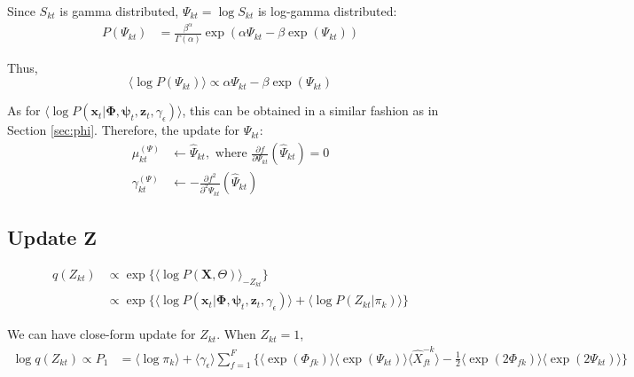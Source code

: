 \documentclass[11pt]{article} %
\begin{document}
Since $S_{kt}$ is gamma distributed, $\Psi_{kt} = \log S_{kt}$ is log-gamma distributed:
\begin{align*}
P(\Psi_{kt}) &= \frac{\beta^\alpha}{\Gamma(\alpha)} \exp(\alpha \Psi_{kt} - \beta \exp(\Psi_{kt}))
\end{align*}

Thus, 
\[
\langle \log P(\Psi_{kt}) \rangle \propto \alpha \Psi_{kt} - \beta \exp(\Psi_{kt})
\]

As for $\langle \log P(\bm{x}_t | \mathbf{\Phi}, \bm{\psi}_t, \mathbf{z}_t, \gamma_\epsilon)\rangle$, this can be obtained in a similar fashion as in Section \ref{sec:phi}. Therefore, the update for $\Psi_{kt}$:
\begin{align*}
\mu_{kt}^{(\Psi)} &\leftarrow \hat{\Psi}_{kt}, \text{ where }  \frac{\partial f}{\partial \Psi_{kt}} (\hat{\Psi}_{kt}) = 0 \\
\gamma_{kt}^{(\Psi)} &\leftarrow -\frac{\partial f^2}{\partial^2 \Psi_{kt}} (\hat{\Psi}_{kt})
\end{align*}

\subsection{Update $\mathbf{Z}$}
\begin{align*}
q(Z_{kt}) &\propto \exp\{\langle\log P(\mathbf{X}, \Theta)\rangle_{-Z_{kt}}\}\\
&\propto \exp\{\langle \log P(\bm{x}_t | \mathbf{\Phi}, \bm{\psi}_t, \mathbf{z}_t, \gamma_\epsilon)\rangle + \langle \log P(Z_{kt} | \pi_k) \rangle \}
\end{align*}

We can have close-form update for $Z_{kt}$. When $Z_{kt} = 1$, 
\begin{align*}
\log q(Z_{kt}) \propto P_1 &= \langle \log \pi_k \rangle + \langle \gamma_\epsilon \rangle \sum_{f=1}^F \{ \langle \exp(\Phi_{fk}) \rangle \langle \exp(\Psi_{kt})  \rangle \langle \hat{X}_{ft}^{-k}\rangle - \frac{1}{2}\langle \exp(2\Phi_{fk}) \rangle \langle\exp(2\Psi_{kt})  \rangle\}
\end{align*}
\end{document}

